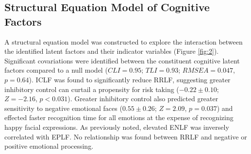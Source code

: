 \documentclass{article}%
\begin{document}
\subsection*{Structural Equation Model of Cognitive Factors} A structural equation model was constructed to explore the interaction between the identified latent factors and their indicator variables (Figure \ref{fig:2}). Significant covariations were identified between the constituent cognitive latent factors compared to a null model ($CLI = 0.95$; $TLI = 0.93$; $RMSEA = 0.047$, $p = 0.64$). ICLF was found to significantly reduce RRLF, suggesting greater inhibitory control can curtail a propensity for risk taking ($-0.22\pm0.10$; $Z=-2.16$, $p<0.031$). Greater inhibitory control also predicted greater sensitivity to negative emotional faces ($0.55\pm0.26$; $Z=2.09$, $p = 0.037$) and effected faster recognition time for all emotions at the expense of recognizing happy facial expressions. As previously noted, elevated ENLF was inversely correlated with EPLF. No relationship was found between RRLF and negative or positive emotional processing.
\end{document}

